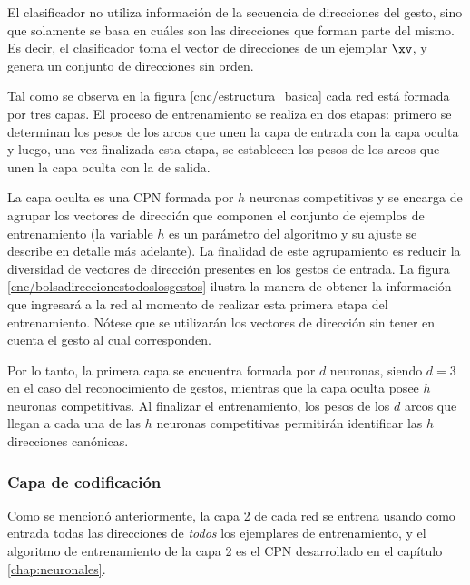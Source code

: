 El clasificador no utiliza información de la secuencia de direcciones del gesto, sino que solamente se basa en cuáles son las direcciones que forman parte del mismo. Es decir, el clasificador toma el vector de direcciones de un ejemplar $\xv$, y genera un conjunto de direcciones sin orden.



Tal como se observa en la figura \ref{cnc/estructura_basica} cada red está formada por tres capas. El proceso de entrenamiento se realiza en dos etapas: primero se determinan los pesos de los arcos que unen la capa de entrada con la capa oculta y luego, una vez finalizada esta etapa, se establecen los pesos de los arcos que unen la capa oculta con la de salida.

La capa oculta es una CPN formada por $h$ neuronas competitivas y se encarga de agrupar los vectores de dirección que componen el conjunto de ejemplos de entrenamiento (la variable $h$ es un parámetro del algoritmo y su ajuste se describe en detalle más adelante). La finalidad de este agrupamiento es reducir la diversidad de vectores de dirección presentes en los gestos de entrada. La figura \ref{cnc/bolsadireccionestodoslosgestos} ilustra la manera de obtener la información que ingresará a la red al momento de realizar esta primera etapa del entrenamiento. Nótese que se utilizarán los vectores de dirección sin tener en cuenta el gesto al cual corresponden. 


Por lo tanto, la primera capa se encuentra formada por $d$ neuronas, siendo $d=3$ en el caso del reconocimiento de gestos, mientras que la capa oculta posee $h$ neuronas competitivas. Al finalizar el entrenamiento, los pesos de los $d$ arcos que llegan a cada una de las $h$ neuronas competitivas permitirán identificar las $h$ direcciones canónicas. 


\subsubsection{Capa de codificación}

Como se mencionó anteriormente, la capa 2 de cada red se entrena usando como entrada todas las direcciones de \textit{todos} los ejemplares de entrenamiento, y el algoritmo de entrenamiento de la capa 2 es el CPN desarrollado en el capítulo \ref{chap:neuronales}.

